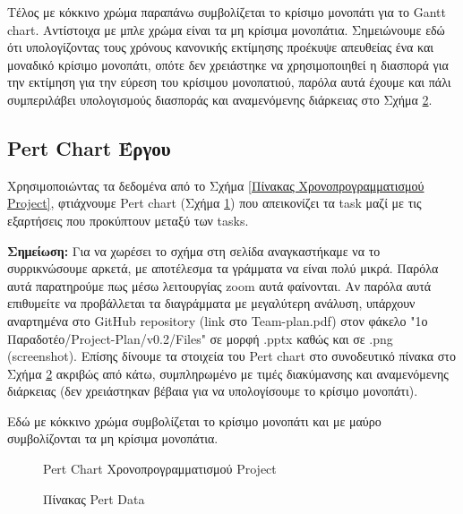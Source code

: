 \documentclass[12pt,a4paper]{article}
\begin{document}
Τέλος με κόκκινο χρώμα παραπάνω συμβολίζεται το κρίσιμο μονοπάτι για το Gantt chart. Αντίστοιχα με μπλε χρώμα είναι τα μη κρίσιμα μονοπάτια. Σημειώνουμε εδώ ότι υπολογίζοντας τους χρόνους κανονικής εκτίμησης προέκυψε απευθείας ένα και μοναδικό κρίσιμο μονοπάτι, οπότε δεν χρειάστηκε να χρησιμοποιηθεί η διασπορά για την εκτίμηση για την εύρεση του κρίσιμου μονοπατιού, παρόλα αυτά έχουμε και πάλι συμπεριλάβει υπολογισμούς διασποράς και αναμενόμενης διάρκειας στο Σχήμα \ref{Πίνακας Pert Data}.

\subsection{Pert Chart Έργου}
\label{Ενότητα Pert Chart Έργου}

Χρησιμοποιώντας τα δεδομένα από το Σχήμα \ref{Πίνακας Χρονοπρογραμματισμού Project}, φτιάχνουμε Pert chart (Σχήμα \ref{Pert Chart Χρονοπρογραμματισμού Project}) που απεικονίζει τα task μαζί με τις εξαρτήσεις που προκύπτουν μεταξύ των tasks.

\textbf{Σημείωση:} Για να χωρέσει το σχήμα στη σελίδα αναγκαστήκαμε να το συρρικνώσουμε αρκετά, με αποτέλεσμα τα γράμματα να είναι πολύ μικρά. Παρόλα αυτά παρατηρούμε πως μέσω λειτουργίας zoom αυτά φαίνονται. Αν παρόλα αυτά επιθυμείτε να προβάλλεται τα διαγράμματα με μεγαλύτερη ανάλυση, υπάρχουν αναρτημένα στο GitHub repository (link στο Team-plan.pdf) στον φάκελο "1ο Παραδοτέο/Project-Plan/v0.2/Files" σε μορφή .pptx καθώς και σε .png (screenshot). Επίσης δίνουμε τα στοιχεία του Pert chart στο συνοδευτικό πίνακα στο Σχήμα \ref{Πίνακας Pert Data} ακριβώς από κάτω, συμπληρωμένο με τιμές διακύμανσης και αναμενόμενης διάρκειας (δεν χρειάστηκαν βέβαια για να υπολογίσουμε το κρίσιμο μονοπάτι).

Εδώ με κόκκινο χρώμα συμβολίζεται το κρίσιμο μονοπάτι και με μαύρο συμβολίζονται τα μη κρίσιμα μονοπάτια.

\begin{figure}[H]
	\caption{Pert Chart Χρονοπρογραμματισμού Project}
	\label{Pert Chart Χρονοπρογραμματισμού Project}
\end{figure}

\begin{figure}[H]
	\caption{Πίνακας Pert Data}
	\label{Πίνακας Pert Data}
\end{figure}
\end{document}
